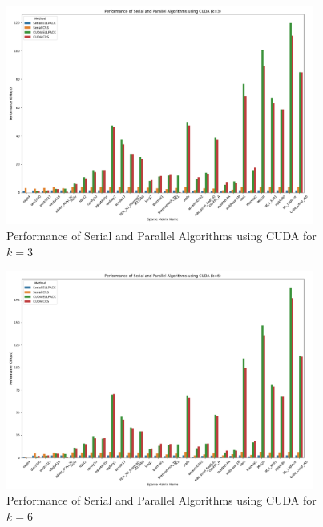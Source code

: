 \documentclass[12pt,oneside]{book} %
\begin{document}
\begin{figure}[H]
    \centering
    \includegraphics[width=0.9\textwidth]{../results/images/CUDA_Performance_k3.png}
    \caption{Performance of Serial and Parallel Algorithms using CUDA for $k=3$}
    \label{fig:cuda-performance-k3}
\end{figure}

\begin{figure}[H]
    \centering
    \includegraphics[width=0.9\textwidth]{../results/images/CUDA_Performance_k6.png}
    \caption{Performance of Serial and Parallel Algorithms using CUDA for $k=6$}
    \label{fig:cuda-performance-k6}
\end{figure}
\end{document}
